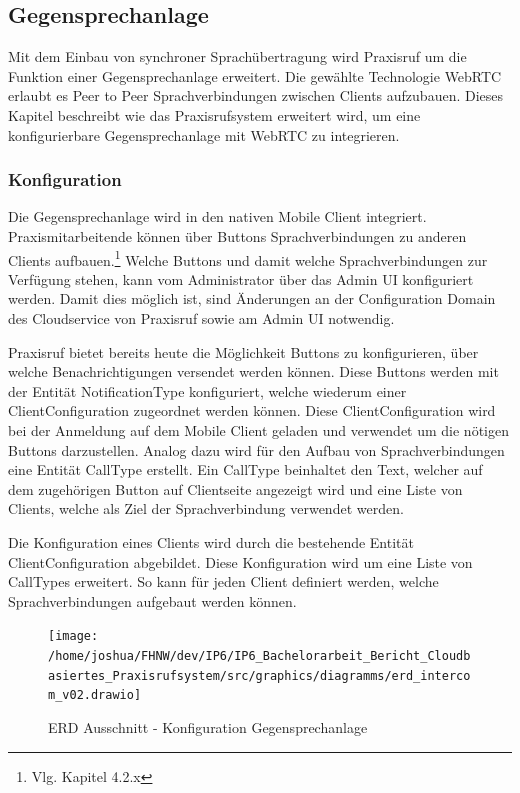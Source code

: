 \subsection{Gegensprechanlage}

Mit dem Einbau von synchroner Sprachübertragung wird Praxisruf um die Funktion einer Gegensprechanlage erweitert.
Die gewählte Technologie WebRTC erlaubt es Peer to Peer Sprachverbindungen zwischen Clients aufzubauen.
Dieses Kapitel beschreibt wie das Praxisrufsystem erweitert wird, um eine konfigurierbare Gegensprechanlage mit WebRTC zu integrieren.

\subsubsection{Konfiguration}

Die Gegensprechanlage wird in den nativen Mobile Client integriert.
Praxismitarbeitende können über Buttons Sprachverbindungen zu anderen Clients aufbauen.\footnote{Vlg. Kapitel 4.2.x}
Welche Buttons und damit welche Sprachverbindungen zur Verfügung stehen, kann vom Administrator über das Admin UI konfiguriert werden.
Damit dies möglich ist, sind Änderungen an der Configuration Domain des Cloudservice von Praxisruf sowie am Admin UI notwendig.

Praxisruf bietet bereits heute die Möglichkeit Buttons zu konfigurieren, über welche Benachrichtigungen versendet werden können.
Diese Buttons werden mit der Entität NotificationType konfiguriert, welche wiederum einer ClientConfiguration zugeordnet werden können.
Diese ClientConfiguration wird bei der Anmeldung auf dem Mobile Client geladen und verwendet um die nötigen Buttons darzustellen.
Analog dazu wird für den Aufbau von Sprachverbindungen eine Entität CallType erstellt.
Ein CallType beinhaltet den Text, welcher auf dem zugehörigen Button auf Clientseite angezeigt wird und eine Liste von Clients, welche als Ziel der Sprachverbindung verwendet werden.

Die Konfiguration eines Clients wird durch die bestehende Entität ClientConfiguration abgebildet.
Diese Konfiguration wird um eine Liste von CallTypes erweitert.
So kann für jeden Client definiert werden, welche Sprachverbindungen aufgebaut werden können.

\begin{figure}[h]
    \centering
    \begin{minipage}[b]{0.7\textwidth}
        \texttt{[image: /home/joshua/FHNW/dev/IP6/IP6\_Bachelorarbeit\_Bericht\_Cloudbasiertes\_Praxisrufsystem/src/graphics/diagramms/erd\_intercom\_v02.drawio]}
        \caption{ERD Ausschnitt - Konfiguration Gegensprechanlage}
    \end{minipage}
\end{figure}

